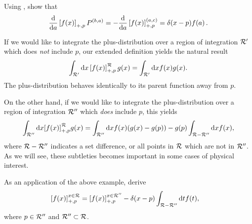 \begin{subappendices}
\begin{exercise}
    \label{ex:plus-fn-derivative}
    Using , show that
    \begin{align}
        \label{eq:plus-fn-derivative}
        \dv{a} \le[f(x)\ri]_{+,p}P^{(b,a)}
        =
        -
        \dv{a} \le[f(x)\ri]_{+,p}^{(a,c)}
        =
        \delta(x-p) f(a)
        \,.
    \end{align}
\end{exercise}


\begin{example}{}
    If we would like to integrate the plus-distribution over a region of integration \(\mathcal{R}'\) which does \textit{not} include \(p\), our extended definition yields the natural result
    \begin{equation}
        \int_{\mathcal{R}'} \dd x\left[f(x)\right]_{+,p}^{\mathcal{R}} g(x)
        =
        \int_{\mathcal{R}'} \dd x f(x) g(x)
        .
    \end{equation}
    The plus-distribution behaves identically to its parent function away from \(p\).

    On the other hand, if we would like to integrate the plus-distribution over a region of integration \(\mathcal{R}''\) which \textit{does} include \(p\), this yields
    \begin{equation}
        \int_{\mathcal{R}''} \dd x{\left[f(x)\right]}_{+,p}^{\mathcal{R}} g(x)
        =
        \int_{\mathcal{R}''} \dd x f(x) (g(x) - g(p))
        -
        g(p) \int_{\mathcal{R} - \mathcal{R}''} \dd x f(x)
        ,
    \end{equation}
    where \(\mathcal{R} - \mathcal{R}''\) indicates a set difference, or all points in \(\mathcal{R}\) which are not in \(\mathcal{R}''\).
    As we will see, these subtleties becomes important in some cases of physical interest.
\end{example}

\begin{exercise}
    As an application of the above example, derive
    \begin{align}
        \left[f(x)\right]_{+,p}^{x \in \mathcal{R}}
        &=
        \left[f(x)\right]_{+,p}^{x \in \mathcal{R}''}
        -
        \delta(x - p) \int_{\mathcal{R} - \mathcal{R}''} \dd t f(t)
        ,
    \end{align}
    where \(p \in \mathcal{R}''\) and \(\mathcal{R}'' \subset \mathcal{R}\).
\end{exercise}



\end{subappendices}
